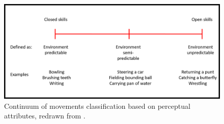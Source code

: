 \begin{figure}
	\centering
	\includegraphics[width=1.0\textwidth]{img/movement_classification2.png}
	\caption{Continuum of movements classification based on perceptual attributes, redrawn from \cite{Schmidt2011}.}
	\label{fig:skills_cont}
\end{figure}

